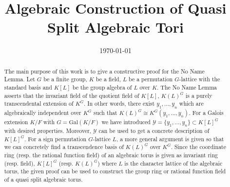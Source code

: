 \documentclass{article}
\title{Algebraic Construction of Quasi Split Algebraic Tori}
\date{\today}
\theoremstyle{plain}
\theoremstyle{definition}
\begin{document}
\maketitle


\begin{abstract}
\noindent
The main purpose of this work is to give a constructive proof for the No Name Lemma. Let $G$ be a finite group, $K$ be a field, $L$ be a permutation $G$-lattice with the standard basis and $K[L]$ be the group algebra of $L$ over $K$. The No Name Lemma asserts that the invariant field of the quotient field of $K[L]$, $K(L)^G$ is a purely transcendental extension of $K^G$. In other words, there exist $y_1, \ldots , y_n$ which are algebraically independent over $K^G$ such that $K(L)^G \cong K^G(y_1, \ldots , y_n)$. For a Galois extension $K/F$ with $G = \mathrm{Gal}(K/F)$ we have introduced $\mathcal{Y}=\lbrace y_1, \ldots, y_n \rbrace \subset K[L]^G$ with desired properties. Moreover, $\mathcal{Y}$ can be used to get a concrete description of $K[L]^G$. For a sign permutation $G$-lattice $L$, a more general argument is given so that we can concretely find a transcendence basis of $K(L)^G$ over $K^G$. Since the coordinate ring (resp. the rational function field) of an algebraic torus is given as invariant ring (resp. field), $K[L]^G$ (resp. $K(L)^G$) where $L$ is the character lattice of the algebraic torus, the given proof can be used to construct the group ring or rational function field of a quasi split algebraic torus.
\end{abstract}
\end{document}
